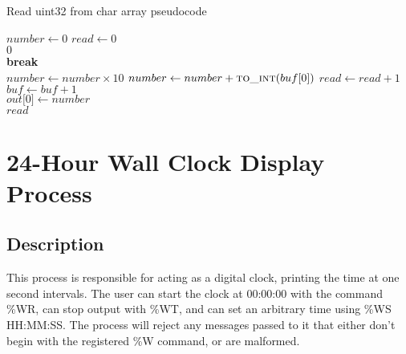 \documentclass[12pt]{report}
\begin{document}
    \begin{algorithm}
        \caption{Read uint32 from char array pseudocode}
        \label{code:read_uint32}
        \begin{algorithmic}[1]
                \State $number \gets 0$
                \State $read \gets 0$
                \\

                    \State \Return $0$
                \EndIf\\

                        \State \textbf{break}
                    \EndIf\\

                    \State $number \gets number \times 10$
                    \State $number \gets number + \Call {to\_int}{buf \lbrack 0 \rbrack}$
                    \State $read \gets read + 1$
                    \State $buf \gets buf + 1$
                \EndWhile\\

                    \State $out \lbrack 0 \rbrack \gets number$
                \EndIf\\

                \State \Return $read$
            \EndFunction
        \end{algorithmic}
    \end{algorithm}

\chapter{24-Hour Wall Clock Display Process}

\section{Description}
    This process is responsible for acting as a digital clock, printing the time
    at one second intervals.  The user can start the clock at 00:00:00 with the
    command \%WR, can stop output with \%WT, and can set an arbitrary time using
    \%WS HH:MM:SS.  The process will reject any messages passed to it that
    either don't begin with the registered \%W command, or are malformed.
\end{document}
